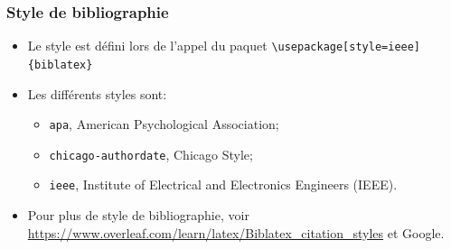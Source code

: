 \begin{frame}[fragile]
  \frametitle{Style de bibliographie}
  \begin{itemize}
      \item Le style est défini lors de l'appel du paquet \lstinline|\usepackage[style=ieee]{biblatex}|
      \item Les différents styles sont:
      \begin{itemize}
          \item \texttt{apa}, American Psychological Association;
          \item \texttt{chicago-authordate}, Chicago Style;
          \item \texttt{ieee}, Institute of Electrical and Electronics Engineers (IEEE).
      \end{itemize}
      \item Pour plus de style de bibliographie, voir \url{https://www.overleaf.com/learn/latex/Biblatex_citation_styles} et Google.
  \end{itemize}
\end{frame}


